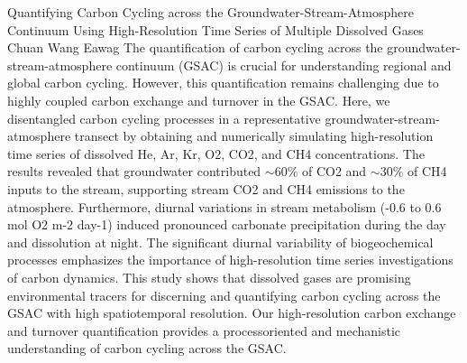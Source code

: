 \begin{conf-abstract}
{Quantifying Carbon Cycling across the Groundwater-Stream-Atmosphere Continuum Using High-Resolution Time Series of Multiple Dissolved Gases}
{Chuan Wang}
{Eawag}
{The quantification of carbon cycling across the groundwater-stream-atmosphere
continuum (GSAC) is crucial for understanding regional and global carbon cycling. However, this
quantification remains challenging due to highly coupled carbon exchange and turnover in the GSAC.
Here, we disentangled carbon cycling processes in a representative groundwater-stream-atmosphere
transect by obtaining and numerically simulating high-resolution time series of dissolved He, Ar, Kr,
O2, CO2, and CH4 concentrations. The results revealed that groundwater contributed $\sim$60\% of CO2
and $\sim$30\% of CH4 inputs to the stream, supporting stream CO2 and CH4 emissions to the atmosphere.
Furthermore, diurnal variations in stream metabolism (-0.6 to 0.6 mol O2 m-2 day-1) induced
pronounced carbonate precipitation during the day and dissolution at night. The significant diurnal
variability of biogeochemical processes emphasizes the importance of high-resolution time series
investigations of carbon dynamics. This study shows that dissolved gases are promising environmental
tracers for discerning and quantifying carbon cycling across the GSAC with high spatiotemporal
resolution. Our high-resolution carbon exchange and turnover quantification provides a processoriented
and mechanistic understanding of carbon cycling across the GSAC.}
\end{conf-abstract}
